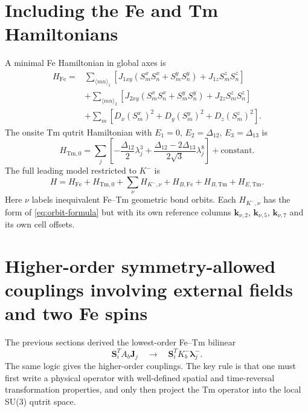 \documentclass[11pt,a4paper]{article}
\newcommand{\Fe}{\mathrm{Fe}}
\newcommand{\Tm}{\mathrm{Tm}}
\newcommand{\ve}[1]{\boldsymbol{#1}}
\newcommand{\lvecminus}{\boldsymbol{\lambda}^{-}}
\begin{document}
\section{Including the Fe and Tm Hamiltonians}

A minimal Fe Hamiltonian in global axes is
\begin{align}
  H_\Fe
  ={}&\sum_{\langle mn\rangle_1}
  \left[J_{1xy}(S_m^xS_n^x+S_m^yS_n^y)+J_{1z}S_m^zS_n^z\right]\\
  &+\sum_{\langle mn\rangle_2}
  \left[J_{2xy}(S_m^xS_n^x+S_m^yS_n^y)+J_{2z}S_m^zS_n^z\right]\\
  &+\sum_m\left[D_x(S_m^x)^2+D_y(S_m^y)^2+D_z(S_m^z)^2\right].
\end{align}
The onsite Tm qutrit Hamiltonian with $E_1=0$, $E_2=\Delta_{12}$, $E_3=\Delta_{13}$ is
\begin{equation}
  H_{\Tm,0}=\sum_j\left[-\frac{\Delta_{12}}{2}\lambda_j^3
  +\frac{\Delta_{12}-2\Delta_{13}}{2\sqrt3}\lambda_j^8\right]
  +\text{constant}.
\end{equation}
The full leading model restricted to $K^-$ is
\begin{equation}
  \boxed{
  H=H_\Fe+H_{\Tm,0}+\sum_\nu H_{K^-,\nu}+H_{B,\Fe}+H_{B,\Tm}+H_{E,\Tm}.}
\end{equation}
Here $\nu$ labels inequivalent Fe--Tm geometric bond orbits.  Each $H_{K^-,\nu}$ has the form of \cref{eq:orbit-formula} but with its own reference columns $\ve k_{\nu,2}$, $\ve k_{\nu,5}$, $\ve k_{\nu,7}$ and its own cell offsets.


\section{Higher-order symmetry-allowed couplings involving external fields and two Fe spins}

The previous sections derived the lowest-order Fe--Tm bilinear
\begin{equation}
  \ve S_i^T A_b\ve J_j
  \quad\longrightarrow\quad
  \ve S_i^T K_b^-\lvecminus_j.
\end{equation}
The same logic gives the higher-order couplings.  The key rule is that one must first write a physical operator with well-defined spatial and time-reversal transformation properties, and only then project the Tm operator into the local SU(3) qutrit space.
\end{document}
